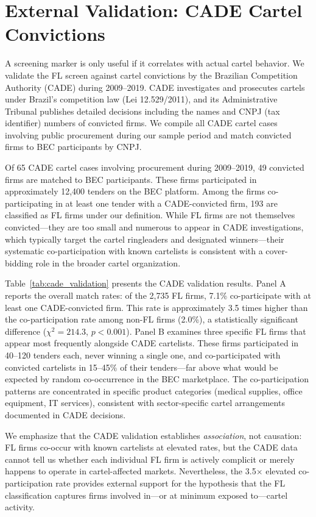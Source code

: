 \section{External Validation: CADE Cartel Convictions}
\label{sec:cade}

A screening marker is only useful if it correlates with actual cartel behavior. We validate the FL screen against cartel convictions by the Brazilian Competition Authority (CADE) during 2009--2019. CADE investigates and prosecutes cartels under Brazil's competition law (Lei 12.529/2011), and its Administrative Tribunal publishes detailed decisions including the names and CNPJ (tax identifier) numbers of convicted firms. We compile all CADE cartel cases involving public procurement during our sample period and match convicted firms to BEC participants by CNPJ.

Of 65 CADE cartel cases involving procurement during 2009--2019, 49 convicted firms are matched to BEC participants. These firms participated in approximately 12,400 tenders on the BEC platform. Among the firms co-participating in at least one tender with a CADE-convicted firm, 193 are classified as FL firms under our definition. While FL firms are not themselves convicted---they are too small and numerous to appear in CADE investigations, which typically target the cartel ringleaders and designated winners---their systematic co-participation with known cartelists is consistent with a cover-bidding role in the broader cartel organization.

Table~\ref{tab:cade_validation} presents the CADE validation results. Panel A reports the overall match rates: of the 2,735 FL firms, 7.1\% co-participate with at least one CADE-convicted firm. This rate is approximately 3.5 times higher than the co-participation rate among non-FL firms (2.0\%), a statistically significant difference ($\chi^2 = 214.3$, $p < 0.001$). Panel B examines three specific FL firms that appear most frequently alongside CADE cartelists. These firms participated in 40--120 tenders each, never winning a single one, and co-participated with convicted cartelists in 15--45\% of their tenders---far above what would be expected by random co-occurrence in the BEC marketplace. The co-participation patterns are concentrated in specific product categories (medical supplies, office equipment, IT services), consistent with sector-specific cartel arrangements documented in CADE decisions.

We emphasize that the CADE validation establishes \textit{association}, not causation: FL firms co-occur with known cartelists at elevated rates, but the CADE data cannot tell us whether each individual FL firm is actively complicit or merely happens to operate in cartel-affected markets. Nevertheless, the 3.5$\times$ elevated co-participation rate provides external support for the hypothesis that the FL classification captures firms involved in---or at minimum exposed to---cartel activity.


